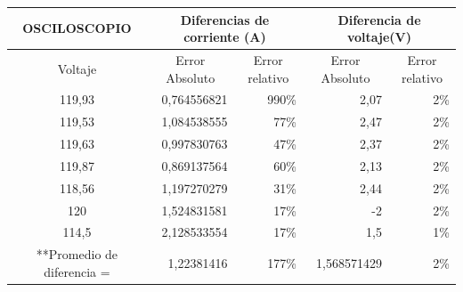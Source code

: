   \begin{table}[htbp]
    \centering
      \begin{tabular}{|c|c|r|r|r|r|}
      \toprule
      \multicolumn{2}{|c|}{OSCILOSCOPIO} & \multicolumn{2}{c|}{\cellcolor[rgb]{ .557,  .663,  .859}Diferencias de corriente (A)} & \multicolumn{2}{c|}{\cellcolor[rgb]{ .557,  .663,  .859}Diferencia de voltaje(V)} \\
      \midrule
      \multicolumn{2}{|c|}{Voltaje} & \multicolumn{1}{c|}{\cellcolor[rgb]{ .557,  .663,  .859}Error Absoluto} & \multicolumn{1}{c|}{\cellcolor[rgb]{ .557,  .663,  .859}Error relativo} & \multicolumn{1}{c|}{\cellcolor[rgb]{ .557,  .663,  .859}Error Absoluto} & \multicolumn{1}{c|}{\cellcolor[rgb]{ .557,  .663,  .859}Error relativo} \\
      \midrule
      \multicolumn{2}{|c|}{119,93} & \cellcolor[rgb]{ .557,  .663,  .859}0,764556821 & \cellcolor[rgb]{ .557,  .663,  .859}990\% & \cellcolor[rgb]{ .557,  .663,  .859}2,07 & \cellcolor[rgb]{ .557,  .663,  .859}2\% \\
      \midrule
      \multicolumn{2}{|c|}{119,53} & \cellcolor[rgb]{ .557,  .663,  .859}1,084538555 & \cellcolor[rgb]{ .557,  .663,  .859}77\% & \cellcolor[rgb]{ .557,  .663,  .859}2,47 & \cellcolor[rgb]{ .557,  .663,  .859}2\% \\
      \midrule
      \multicolumn{2}{|c|}{119,63} & \cellcolor[rgb]{ .557,  .663,  .859}0,997830763 & \cellcolor[rgb]{ .557,  .663,  .859}47\% & \cellcolor[rgb]{ .557,  .663,  .859}2,37 & \cellcolor[rgb]{ .557,  .663,  .859}2\% \\
      \midrule
      \multicolumn{2}{|c|}{119,87} & \cellcolor[rgb]{ .557,  .663,  .859}0,869137564 & \cellcolor[rgb]{ .557,  .663,  .859}60\% & \cellcolor[rgb]{ .557,  .663,  .859}2,13 & \cellcolor[rgb]{ .557,  .663,  .859}2\% \\
      \midrule
      \multicolumn{2}{|c|}{118,56} & \cellcolor[rgb]{ .557,  .663,  .859}1,197270279 & \cellcolor[rgb]{ .557,  .663,  .859}31\% & \cellcolor[rgb]{ .557,  .663,  .859}2,44 & \cellcolor[rgb]{ .557,  .663,  .859}2\% \\
      \midrule
      \multicolumn{2}{|c|}{120} & \cellcolor[rgb]{ .557,  .663,  .859}1,524831581 & \cellcolor[rgb]{ .557,  .663,  .859}17\% & \cellcolor[rgb]{ .557,  .663,  .859}-2 & \cellcolor[rgb]{ .557,  .663,  .859}2\% \\
      \midrule
      \multicolumn{2}{|c|}{114,5} & \cellcolor[rgb]{ .557,  .663,  .859}2,128533554 & \cellcolor[rgb]{ .557,  .663,  .859}17\% & \cellcolor[rgb]{ .557,  .663,  .859}1,5 & \cellcolor[rgb]{ .557,  .663,  .859}1\% \\
      \midrule
      \multicolumn{2}{|c|}{**Promedio de diferencia =} & \cellcolor[rgb]{ .557,  .663,  .859}1,22381416 & \cellcolor[rgb]{ .557,  .663,  .859}177\% & \cellcolor[rgb]{ .557,  .663,  .859}1,568571429 & \cellcolor[rgb]{ .557,  .663,  .859}2\% \\
      \bottomrule
      \end{tabular}%
    \label{tab:resultado1-2}%
  \end{table}%

